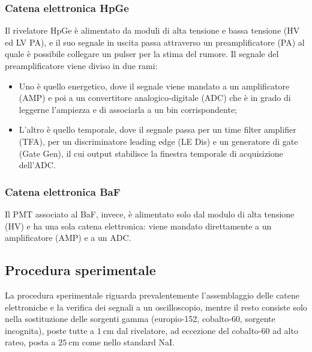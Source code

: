 \documentclass{article}
\begin{document}
            \subsubsection*{Catena elettronica HpGe}
                Il rivelatore HpGe è alimentato da moduli di alta tensione e bassa tensione (HV ed LV PA), e il suo segnale in uscita passa attraverso un preamplificatore (PA) al quale è possibile collegare un pulser per la stima del rumore. Il segnale del preamplificatore viene diviso in due rami:
                \begin{itemize}
                    \item Uno è quello energetico, dove il segnale viene mandato a un amplificatore (AMP) e poi a un convertitore analogico-digitale (ADC) che è in grado di leggerne l'ampiezza e di associarla a un bin corrispondente;
                    \item L'altro è quello temporale, dove il segnale passa per un time filter amplifier (TFA), per un discriminatore leading edge (LE Dis) e un generatore di gate (Gate Gen), il cui output stabilisce la finestra temporale di acquisizione dell'ADC.
                \end{itemize}


            \subsubsection*{Catena elettronica BaF}
            Il PMT associato al BaF, invece, è alimentato solo dal modulo di alta tensione (HV) e ha una sola catena elettronica: viene mandato direttamente a un amplificatore (AMP) e a un ADC.

        \subsection*{Procedura sperimentale}
                La procedura sperimentale riguarda prevalentemente l'assemblaggio delle catene elettroniche e la verifica dei segnali a un oscilloscopio, mentre il resto consiste solo nella sostituzione delle sorgenti gamma (europio-152, cobalto-60, sorgente incognita), poste tutte a $\SI{1}{\centi\meter}$ dal rivelatore, ad eccezione del cobalto-60 ad alto rateo, posta a $\SI{25}{\centi\meter}$ come nello standard NaI.
\end{document}
